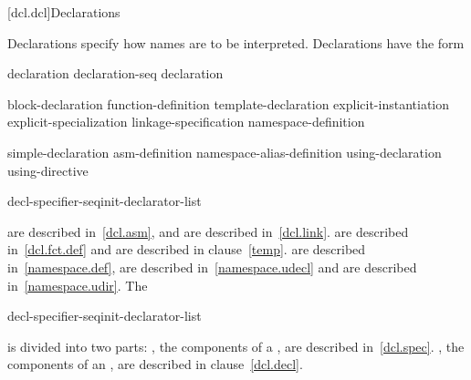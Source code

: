 [dcl.dcl]{Declarations}%



\pnum
Declarations specify how names are to be interpreted. Declarations have
the form

\begin{bnf}
\br
    declaration\br
    declaration-seq declaration
\end{bnf}

\begin{bnf}
\br
    block-declaration\br
    function-definition\br
    template-declaration\br
    explicit-instantiation\br
    explicit-specialization\br
    linkage-specification\br
    namespace-definition
\end{bnf}

\begin{bnf}
\br
    simple-declaration\br
    asm-definition\br
    namespace-alias-definition\br
    using-declaration\br
    using-directive
\end{bnf}

\begin{bnf}
\br
    decl-specifier-seq\opt init-declarator-list\opt \terminal{;}
\end{bnf}

\enternote
{} are described in~\ref{dcl.asm}, and
 are described in~\ref{dcl.link}.
 are described in~\ref{dcl.fct.def} and
 are described in clause~\ref{temp}.
 are described in~\ref{namespace.def},
 are described in~\ref{namespace.udecl} and
 are described in~\ref{namespace.udir}.
\exitnote 
The 

\begin{ncsimplebnf}
decl-specifier-seq\opt init-declarator-list\opt \terminal{;}
\end{ncsimplebnf}

is divided into two parts: , the components of
a , are described in~\ref{dcl.spec}.
, the components of an
, are described in clause~\ref{dcl.decl}.

